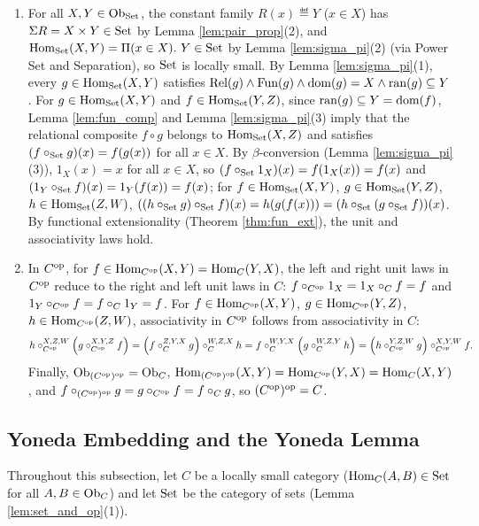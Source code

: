 \documentclass[10pt,a4paper]{article}
\begin{document}
\begin{enumerate}
\item For all $X, Y \in {\textrm{Ob}}_{\textrm{Set}}$, the constant family $R(x) \eqdef Y$ ($x \in X$) has $\Sigma R = X \times Y \in {\textrm{Set}}$ by Lemma \ref{lem:pair_prop}(2), and ${\textrm{Hom}}_{\textrm{Set}}(X,Y) = \Pi(x \in X).\ Y \in {\textrm{Set}}$ by Lemma \ref{lem:sigma_pi}(2) (via Power Set and Separation), so ${\textrm{Set}}$ is locally small. By Lemma \ref{lem:sigma_pi}(1), every $g \in {\textrm{Hom}}_{\textrm{Set}}(X,Y)$ satisfies ${\textrm{Rel}}(g) \land {\textrm{Fun}}(g) \land {\textrm{dom}}(g) = X \land {\textrm{ran}}(g) \subseteq Y$. For $g \in {\textrm{Hom}}_{\textrm{Set}}(X,Y)$ and $f \in {\textrm{Hom}}_{\textrm{Set}}(Y,Z)$, since ${\textrm{ran}}(g) \subseteq Y = {\textrm{dom}}(f)$, Lemma \ref{lem:fun_comp} and Lemma \ref{lem:sigma_pi}(3) imply that the relational composite $f \circ g$ belongs to ${\textrm{Hom}}_{\textrm{Set}}(X,Z)$ and satisfies $(f \circ_{\textrm{Set}} g)(x) = f(g(x))$ for all $x \in X$. By $\beta$-conversion (Lemma \ref{lem:sigma_pi}(3)), $1_X(x) = x$ for all $x \in X$, so $(f \circ_{\textrm{Set}} 1_X)(x) = f(1_X(x)) = f(x)$ and $(1_Y \circ_{\textrm{Set}} f)(x) = 1_Y(f(x)) = f(x)$; for $f \in {\textrm{Hom}}_{\textrm{Set}}(X,Y)$, $g \in {\textrm{Hom}}_{\textrm{Set}}(Y,Z)$, $h \in {\textrm{Hom}}_{\textrm{Set}}(Z,W)$, $((h \circ_{\textrm{Set}} g) \circ_{\textrm{Set}} f)(x) = h(g(f(x))) = (h \circ_{\textrm{Set}} (g \circ_{\textrm{Set}} f))(x)$. By functional extensionality (Theorem \ref{thm:fun_ext}), the unit and associativity laws hold.
\item In $C^{\textrm{op}}$, for $f \in {\textrm{Hom}}_{C^{\textrm{op}}}(X,Y) = {\textrm{Hom}}_C(Y,X)$, the left and right unit laws in $C^{\textrm{op}}$ reduce to the right and left unit laws in $C$: $f \circ_{C^{\textrm{op}}} 1_X = 1_X \circ_C f = f$ and $1_Y \circ_{C^{\textrm{op}}} f = f \circ_C 1_Y = f$. For $f \in {\textrm{Hom}}_{C^{\textrm{op}}}(X,Y)$, $g \in {\textrm{Hom}}_{C^{\textrm{op}}}(Y,Z)$, $h \in {\textrm{Hom}}_{C^{\textrm{op}}}(Z,W)$, associativity in $C^{\textrm{op}}$ follows from associativity in $C$:
$$h \circ_{C^{\textrm{op}}}^{X,Z,W} \left(g \circ_{C^{\textrm{op}}}^{X,Y,Z} f\right) = \left(f \circ_C^{Z,Y,X} g\right) \circ_C^{W,Z,X} h = f \circ_C^{W,Y,X} \left(g \circ_C^{W,Z,Y} h\right) = \left(h \circ_{C^{\textrm{op}}}^{Y,Z,W} g\right) \circ_{C^{\textrm{op}}}^{X,Y,W} f.$$
Finally, ${\textrm{Ob}}_{(C^{\textrm{op}})^{\textrm{op}}} = {\textrm{Ob}}_C$, ${\textrm{Hom}}_{(C^{\textrm{op}})^{\textrm{op}}}(X,Y) = {\textrm{Hom}}_{C^{\textrm{op}}}(Y,X) = {\textrm{Hom}}_C(X,Y)$, and $f \circ_{(C^{\textrm{op}})^{\textrm{op}}} g = g \circ_{C^{\textrm{op}}} f = f \circ_C g$, so $(C^{\textrm{op}})^{\textrm{op}} = C$.
\end{enumerate}
\myqed

\subsection{Yoneda Embedding and the Yoneda Lemma}\label{sec:yoneda_lemma}
Throughout this subsection, let $C$ be a locally small category (${\textrm{Hom}}_C(A,B) \in {\textrm{Set}}$ for all $A,B \in {\textrm{Ob}}_C$) and let ${\textrm{Set}}$ be the category of sets (Lemma \ref{lem:set_and_op}(1)).
\end{document}
